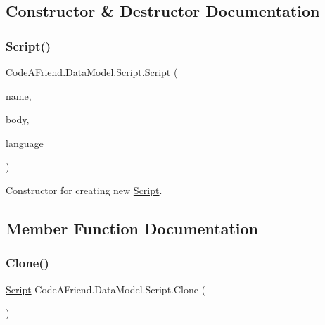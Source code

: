 \subsection{Constructor \& Destructor Documentation}
\mbox{\label{class_code_a_friend_1_1_data_model_1_1_script_a1f92caf940d4376a3f2e96833b3ee029}} 
\subsubsection{\texorpdfstring{Script()}{Script()}}
{\footnotesize\ttfamily Code\+A\+Friend.\+Data\+Model.\+Script.\+Script (\begin{DoxyParamCaption}\item[{string}]{name,  }\item[{string}]{body,  }\item[{\mbox{\hyperlink{namespace_code_a_friend_1_1_data_model_a13e088c525db1b03a4de75420ced79b2}{Supported\+Language}}}]{language }\end{DoxyParamCaption})}



Constructor for creating new \mbox{\hyperlink{class_code_a_friend_1_1_data_model_1_1_script}{Script}}.



\subsection{Member Function Documentation}
\mbox{\label{class_code_a_friend_1_1_data_model_1_1_script_a02124202d7f885992a243853531b3216}} 
\subsubsection{\texorpdfstring{Clone()}{Clone()}}
{\footnotesize\ttfamily \mbox{\hyperlink{class_code_a_friend_1_1_data_model_1_1_script}{Script}} Code\+A\+Friend.\+Data\+Model.\+Script.\+Clone (\begin{DoxyParamCaption}{ }\end{DoxyParamCaption})}



